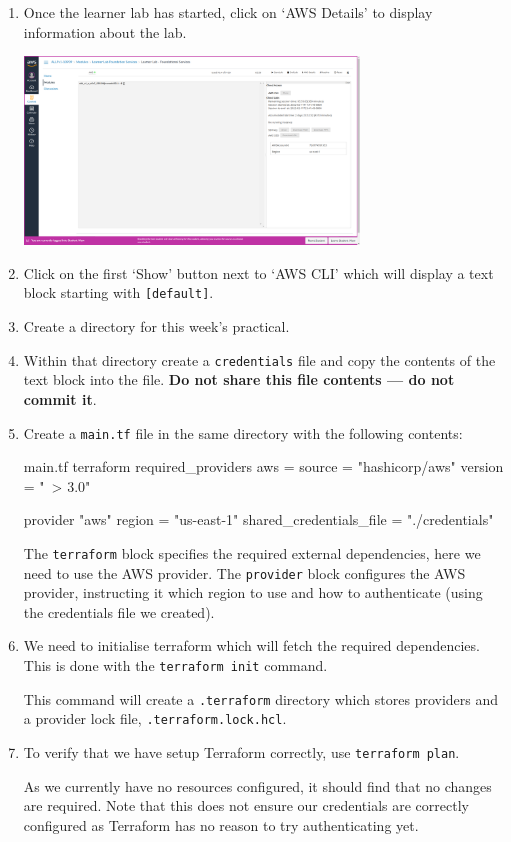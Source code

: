 \documentclass{csse4400}
\begin{document}
\begin{enumerate}
\item Once the learner lab has started, click on `AWS Details' to display information about the lab.

\includegraphics[width=0.7\textwidth]{images/aws-details}

\item Click on the first `Show' button next to `AWS CLI' which will display a text block starting with \texttt{[default]}.
\item Create a directory for this week's practical.
\item Within that directory create a \texttt{credentials} file and copy the contents of the text block into the file.
\textbf{Do not share this file contents --- do not commit it}.
\item Create a \texttt{main.tf} file in the same directory with the following contents:
\begin{code}[language=terraform]{main.tf}
terraform {
    required_providers {
        aws = {
            source  = "hashicorp/aws"
            version = "~> 3.0"
        }
    }
}

provider "aws" {
    region = "us-east-1"
    shared_credentials_file = "./credentials"
}
\end{code}

The \texttt{terraform} block specifies the required external dependencies, here we need to use the AWS provider.
The \texttt{provider} block configures the AWS provider, instructing it which region to use and how to authenticate (using the credentials file we created).

\item We need to initialise terraform which will fetch the required dependencies. This is done with the \texttt{terraform init} command.

This command will create a \texttt{.terraform} directory which stores providers and a provider lock file, \texttt{.terraform.lock.hcl}.

\item To verify that we have setup Terraform correctly, use \texttt{terraform plan}.

As we currently have no resources configured, it should find that no changes are required.
Note that this does not ensure our credentials are correctly configured as Terraform has no reason to try authenticating yet.

\end{enumerate}
\end{document}
